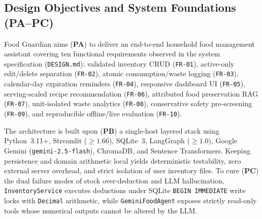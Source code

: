 \documentclass[conference]{IEEEtran}
\begin{document}
\subsection{Design Objectives and System Foundations (PA--PC)}
Food Guardian aims (\textbf{PA}) to deliver an end-to-end household food management assistant covering ten functional requirements observed in the system specification (\texttt{DESIGN.md}): validated inventory CRUD (\texttt{FR-01}), active-only edit/delete separation (\texttt{FR-02}), atomic consumption/waste logging (\texttt{FR-03}), calendar-day expiration reminders (\texttt{FR-04}), responsive dashboard UI (\texttt{FR-05}), serving-scaled recipe recommendation (\texttt{FR-06}), attributed food preservation RAG (\texttt{FR-07}), unit-isolated waste analytics (\texttt{FR-08}), conservative safety pre-screening (\texttt{FR-09}), and reproducible offline/live evaluation (\texttt{FR-10}).

The architecture is built upon (\textbf{PB}) a single-host layered stack using Python~3.11+, Streamlit ($\ge 1.66$), SQLite~3, LangGraph ($\ge 1.0$), Google Gemini (\texttt{gemini-2.5-flash}), ChromaDB, and Sentence Transformers. Keeping persistence and domain arithmetic local yields deterministic testability, zero external server overhead, and strict isolation of user inventory files. To cure (\textbf{PC}) the dual failure modes of stock over-deduction and LLM hallucination, \texttt{InventoryService} executes deductions under SQLite \texttt{BEGIN IMMEDIATE} write locks with \texttt{Decimal} arithmetic, while \texttt{GeminiFoodAgent} exposes strictly read-only tools whose numerical outputs cannot be altered by the LLM.

\end{document}
